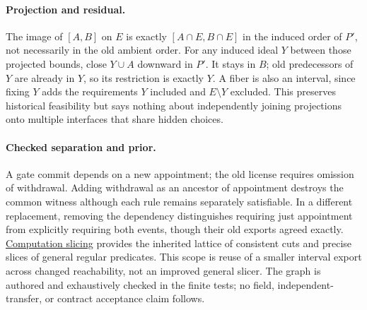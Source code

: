 \documentclass{article}
\begin{document}
\paragraph{Projection and residual.}
The image of \([A,B]\) on \(E\) is exactly \([A\cap E,B\cap E]\) in the induced order of \(P'\), not necessarily in the old ambient order. For any induced ideal \(Y\) between those projected bounds, close \(Y\cup A\) downward in \(P'\). It stays in \(B\); old predecessors of \(Y\) are already in \(Y\), so its restriction is exactly \(Y\). A fiber is also an interval, since fixing \(Y\) adds the requirements \(Y\) included and \(E\setminus Y\) excluded. This preserves historical feasibility but says nothing about independently joining projections onto multiple interfaces that share hidden choices.

\paragraph{Checked separation and prior.}
A gate commit depends on a new appointment; the old license requires omission of withdrawal. Adding withdrawal as an ancestor of appointment destroys the common witness although each rule remains separately satisfiable. In a different replacement, removing the dependency distinguishes requiring just appointment from explicitly requiring both events, though their old exports agreed exactly. \href{https://users.ece.utexas.edu/~garg/dist/dcs01-slice.pdf}{Computation slicing} provides the inherited lattice of consistent cuts and precise slices of general regular predicates. This scope is reuse of a smaller interval export across changed reachability, not an improved general slicer. The graph is authored and exhaustively checked in the finite tests; no field, independent-transfer, or contract acceptance claim follows.
\end{document}
